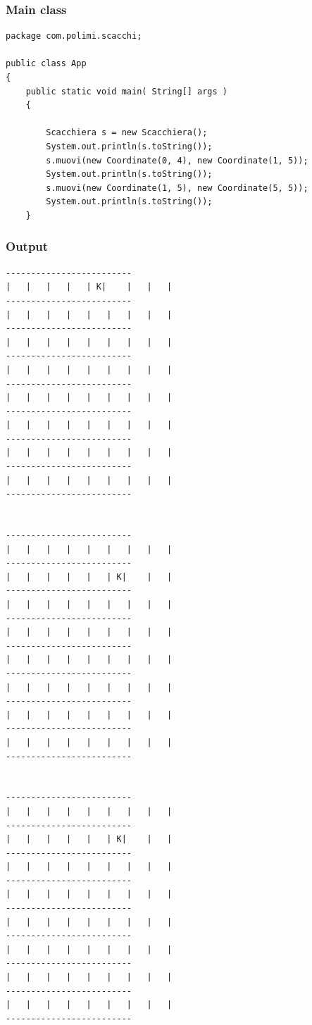 \documentclass{article}
\begin{document}
\subsubsection{Main class}
\begin{lstlisting}
package com.polimi.scacchi;

public class App 
{
    public static void main( String[] args )
    {
    	
        Scacchiera s = new Scacchiera();
        System.out.println(s.toString());
        s.muovi(new Coordinate(0, 4), new Coordinate(1, 5));
        System.out.println(s.toString());
        s.muovi(new Coordinate(1, 5), new Coordinate(5, 5));
        System.out.println(s.toString());
    }
\end{lstlisting}

 \subsubsection{Output}
 \begin{lstlisting}
-------------------------
|   |   |   |   | K|    |   |   | 
-------------------------
|   |   |   |   |   |   |   |   | 
-------------------------
|   |   |   |   |   |   |   |   | 
-------------------------
|   |   |   |   |   |   |   |   | 
-------------------------
|   |   |   |   |   |   |   |   | 
-------------------------
|   |   |   |   |   |   |   |   | 
-------------------------
|   |   |   |   |   |   |   |   | 
-------------------------
|   |   |   |   |   |   |   |   | 
-------------------------
 
 
-------------------------
|   |   |   |   |   |   |   |   | 
-------------------------
|   |   |   |   |   | K|    |   | 
-------------------------
|   |   |   |   |   |   |   |   | 
-------------------------
|   |   |   |   |   |   |   |   | 
-------------------------
|   |   |   |   |   |   |   |   | 
-------------------------
|   |   |   |   |   |   |   |   | 
-------------------------
|   |   |   |   |   |   |   |   | 
-------------------------
|   |   |   |   |   |   |   |   | 
-------------------------
 
 
-------------------------
|   |   |   |   |   |   |   |   | 
-------------------------
|   |   |   |   |   | K|    |   | 
-------------------------
|   |   |   |   |   |   |   |   | 
-------------------------
|   |   |   |   |   |   |   |   | 
-------------------------
|   |   |   |   |   |   |   |   | 
-------------------------
|   |   |   |   |   |   |   |   | 
-------------------------
|   |   |   |   |   |   |   |   | 
-------------------------
|   |   |   |   |   |   |   |   | 
-------------------------
\end{lstlisting}
\end{document}
